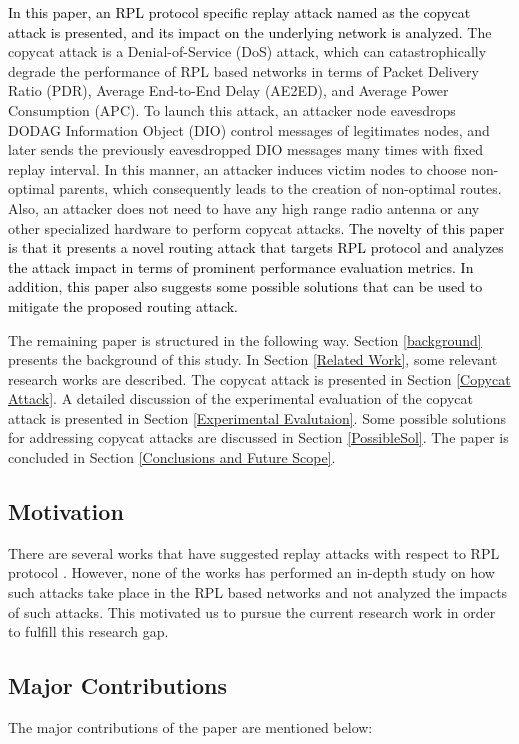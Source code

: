 \documentclass[]{svjour3}                     %
\begin{document}
\textcolor{black}{In this paper, an RPL protocol specific replay attack named as the copycat attack is presented, and its impact on the underlying network is analyzed.} The copycat attack is a Denial-of-Service (DoS) attack, which can catastrophically degrade the performance of RPL based networks in terms of Packet Delivery Ratio (PDR), Average End-to-End Delay (AE2ED), and Average Power Consumption (APC). To launch this attack, an attacker node eavesdrops DODAG Information Object (DIO) control messages of legitimates nodes, and later sends the previously eavesdropped DIO messages many times with fixed replay interval. In this manner, an attacker induces victim nodes to choose non-optimal parents, which consequently leads to the creation of non-optimal routes.  Also, an attacker does not need to have any high range radio antenna or any other specialized hardware to perform copycat attacks. \textcolor{black}{The novelty of this paper is that it presents a novel routing attack that targets RPL protocol and analyzes the attack impact in terms of prominent performance evaluation metrics. In addition, this paper also suggests some possible solutions that can be used to mitigate the proposed routing attack.}    

The remaining paper is structured in the following way. Section \ref{background} presents the background of this study. In Section \ref{Related Work}, some relevant research works are described. The copycat attack is presented in Section \ref{Copycat Attack}. A detailed discussion of the experimental evaluation of the copycat attack is presented in Section \ref{Experimental Evalutaion}. Some possible solutions for addressing copycat attacks are discussed in Section \ref{PossibleSol}. The paper is concluded in Section \ref{Conclusions and Future Scope}.


\subsection{Motivation}

There are several works that have suggested replay attacks with respect to RPL protocol \cite{Le2013, Mayzaud2016Taxanomy, Raoof}. However, none of the works has performed an in-depth study on how such attacks take place in the RPL based networks and not analyzed the impacts of such attacks. This motivated us to pursue the current research work in order to fulfill this research gap.   

\subsection{Major Contributions}
The major contributions of the paper are mentioned below:
\end{document}
